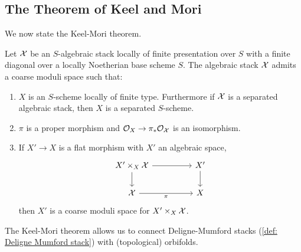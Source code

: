 \subsection{The Theorem of Keel and Mori}\label{subsec: Keel Mori theorem}
We now state the Keel-Mori theorem. 
\begin{theorem}\label{thm: Keel Mori theorem}
    Let $\mathcal{X}$ be an $S$-algebraic stack locally of finite presentation over $S$ with a finite diagonal over a locally Noetherian base scheme $S$. The algebraic stack $\mathcal{X}$ admits a coarse moduli space such that:
    \begin{enumerate}[label=(\alph*)]
        \item $X$ is an $S$-scheme locally of finite type. Furthermore if $\mathcal{X}$ is a separated algebraic stack, then $X$ is a separated $S$-scheme. 
        \item $\pi$ is a proper morphism and $\mathcal{O}_{X}\to\pi_{*}\mathcal{O}_{\mathcal{X}}$ is an isomorphism. 
        \item If $X'\to X$ is a flat morphism with $X'$ an algebraic space, 
        $$%
        \begin{tikzcd}
            {X'\times_{X}\Xcal} && {X'} \\
            \Xcal && X
            \arrow["\pi"', from=2-1, to=2-3]
            \arrow[from=1-3, to=2-3]
            \arrow[from=1-1, to=2-1]
            \arrow[from=1-1, to=1-3]
        \end{tikzcd}$$
        then $X'$ is a coarse moduli space for $X'\times_{X}\mathcal{X}$. 
    \end{enumerate}
\end{theorem}
The Keel-Mori theorem allows us to connect Deligne-Mumford stacks (\ref{def: Deligne Mumford stack}) with (topological) orbifolds. 
\newpage
